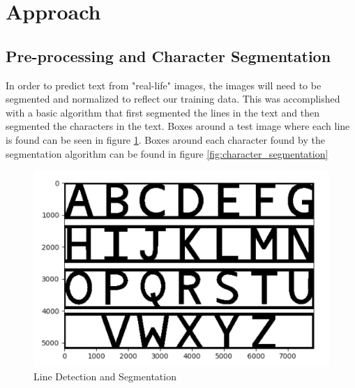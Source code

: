 \documentclass[11pt]{article}
\begin{document}

\section{Approach}

\subsection{Pre-processing and Character Segmentation}
    
    In order to predict text from "real-life" images, the images will need to be segmented and normalized to reflect our training data. This was accomplished with a basic algorithm that first segmented the lines in the text and then segmented the characters in the text. Boxes around a test image where each line is found can be seen in figure \ref{fig:line_segmentation}. Boxes around each character found by the segmentation algorithm can be found in figure \ref{fig:character_segmentation}
    
    \begin{figure}
        \centering
        \includegraphics[scale=0.4]{line_segmentation_example.png}
        \caption{Line Detection and Segmentation}
        \label{fig:line_segmentation}
    \end{figure}
    
\end{document}
